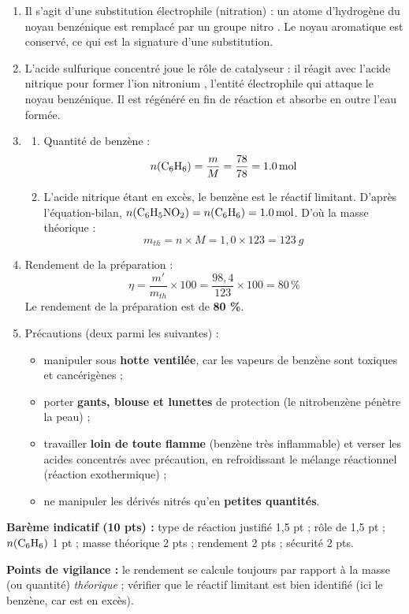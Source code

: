 \documentclass[11pt]{article}
\newcommand{\cle}[1]{{\popxbold\color{popdark}#1}}
\begin{document}
\begin{corrige}
\begin{enumerate}
\item Il s'agit d'une \cle{substitution électrophile} (nitration) : un atome d'hydrogène du noyau benzénique est remplacé par un groupe nitro . Le noyau aromatique est conservé, ce qui est la signature d'une substitution.
\item L'acide sulfurique concentré joue le rôle de \cle{catalyseur} : il réagit avec l'acide nitrique pour former l'ion nitronium , l'entité électrophile qui attaque le noyau benzénique. Il est régénéré en fin de réaction et absorbe en outre l'eau formée.
\item 
\begin{enumerate}
\item Quantité de benzène :
\[ n(\ce{C6H6}) = \frac{m}{M} = \frac{78}{78} = \SI{1,0}{mol} \]
\item L'acide nitrique étant en excès, le benzène est le réactif limitant. D'après l'équation-bilan, $n(\ce{C6H5NO2}) = n(\ce{C6H6}) = \SI{1,0}{mol}$. D'où la masse théorique :
\[ m_{th} = n \times M = 1,0 \times 123 = \SI{123}{g} \]
\end{enumerate}
\item Rendement de la préparation :
\[ \eta = \frac{m'}{m_{th}} \times 100 = \frac{98,4}{123} \times 100 = 80\,\% \]
Le rendement de la préparation est de \textbf{80 \%}.
\item Précautions (deux parmi les suivantes) :
\begin{itemize}
\item manipuler sous \textbf{hotte ventilée}, car les vapeurs de benzène sont toxiques et cancérigènes ;
\item porter \textbf{gants, blouse et lunettes} de protection (le nitrobenzène pénètre la peau) ;
\item travailler \textbf{loin de toute flamme} (benzène très inflammable) et verser les acides concentrés avec précaution, en refroidissant le mélange réactionnel (réaction exothermique) ;
\item ne manipuler les dérivés nitrés qu'en \textbf{petites quantités}.
\end{itemize}
\end{enumerate}
\textbf{Barème indicatif (10 pts) :} type de réaction justifié 1,5 pt ; rôle de  1,5 pt ; $n(\ce{C6H6})$ 1 pt ; masse théorique 2 pts ; rendement 2 pts ; sécurité 2 pts.

\textbf{Points de vigilance :} le rendement se calcule toujours par rapport à la masse (ou quantité) \emph{théorique} ; vérifier que le réactif limitant est bien identifié (ici le benzène, car  est en excès).
\end{corrige}
\end{document}
